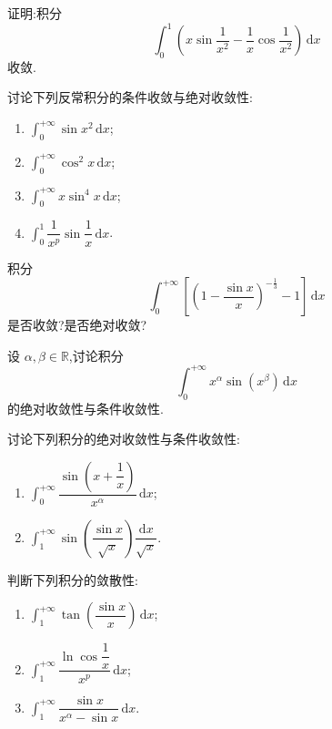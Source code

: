 \documentclass[../../数学分析培优讲义.tex]{subfiles}
\begin{document}
\begin{example}
证明:积分
\[
    \int_0^1\left(x\sin\dfrac{1}{x^2}-\dfrac{1}{x}\cos\dfrac{1}{x^2}\right)\,\mathrm{d}x
\]
收敛.
\end{example}
\exampleblank

\begin{example}
讨论下列反常积分的条件收敛与绝对收敛性:
\begin{enumerate}[label=(\arabic*)]
    \item $\displaystyle\int_0^{+\infty}\sin x^2\,\mathrm{d}x$;
    \item $\displaystyle\int_0^{+\infty}\cos^2x\,\mathrm{d}x$;
    \item $\displaystyle\int_0^{+\infty}x\sin^4x\,\mathrm{d}x$;
    \item $\displaystyle\int_0^1\dfrac{1}{x^p}\sin\dfrac{1}{x}\,\mathrm{d}x$.
\end{enumerate}
\end{example}
\exampleblank

\begin{example}
积分
\[
    \int_0^{+\infty}\left[\left(1-\dfrac{\sin x}{x}\right)^{-\frac{1}{3}}-1\right]\,\mathrm{d}x
\]
是否收敛?是否绝对收敛?
\end{example}
\exampleblank

\begin{example}
设 $\alpha,\beta\in\mathbb{R}$,讨论积分
\[
    \int_0^{+\infty}x^\alpha\sin(x^\beta)\,\mathrm{d}x
\]
的绝对收敛性与条件收敛性.
\end{example}
\exampleblank

\begin{example}
讨论下列积分的绝对收敛性与条件收敛性:
\begin{enumerate}[label=(\arabic*)]
    \item $\displaystyle\int_0^{+\infty}\dfrac{\sin\left(x+\dfrac{1}{x}\right)}{x^\alpha}\,\mathrm{d}x$;
    \item $\displaystyle\int_1^{+\infty}\sin\left(\dfrac{\sin x}{\sqrt{x}}\right)\dfrac{\mathrm{d}x}{\sqrt{x}}$.
\end{enumerate}
\end{example}
\exampleblank

\begin{example}
判断下列积分的敛散性:
\begin{enumerate}[label=(\arabic*)]
    \item $\displaystyle\int_1^{+\infty}\tan\left(\dfrac{\sin x}{x}\right)\,\mathrm{d}x$;
    \item $\displaystyle\int_1^{+\infty}\dfrac{\ln\cos\dfrac{1}{x}}{x^p}\,\mathrm{d}x$;
    \item $\displaystyle\int_1^{+\infty}\dfrac{\sin x}{x^\alpha-\sin x}\,\mathrm{d}x$.
\end{enumerate}
\end{example}
\exampleblank
\end{document}
